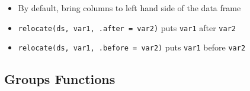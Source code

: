 \documentclass[
  letterpaper,
  DIV=11,
  numbers=noendperiod]{scrreprt}
\providecommand{\tightlist}{%
  \setlength{\itemsep}{0pt}\setlength{\parskip}{0pt}}\usepackage{longtable,booktabs,array}
\begin{document}
\begin{itemize}
  \begin{itemize}
  \tightlist
  \item
    By default, bring columns to left hand side of the data frame
  \item
    \texttt{relocate(ds,\ var1,\ .after\ =\ var2)} puts \texttt{var1}
    after \texttt{var2}
  \item
    \texttt{relocate(ds,\ var1,\ .before\ =\ var2)} puts \texttt{var1}
    before \texttt{var2}
  \end{itemize}
\end{itemize}

\subsection{Groups Functions}\label{groups-functions}
\end{document}
